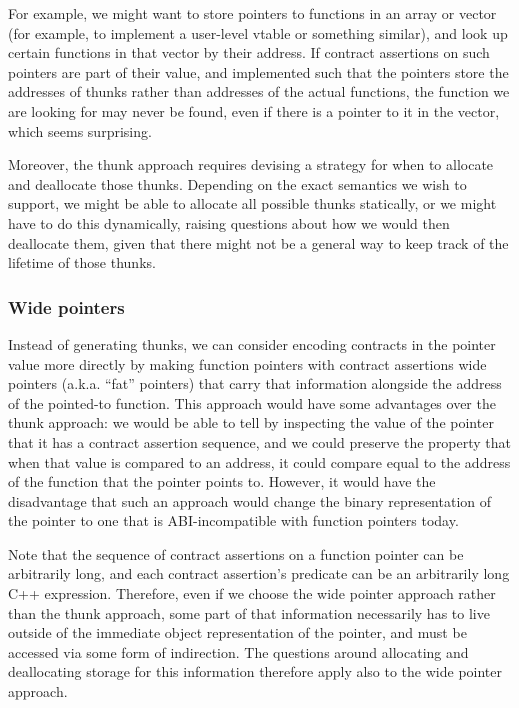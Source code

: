 For example, we might want to store pointers to functions in an array or vector (for example, to implement a user-level vtable or something similar), and look up certain functions in that vector by their address. If contract assertions on such pointers are part of their value, and implemented such that the pointers store the addresses of thunks rather than addresses of the actual functions, the function we are looking for may never be found, even if there is a pointer to it in the vector, which seems surprising.

Moreover, the thunk approach requires devising a strategy for when to allocate and deallocate those thunks. Depending on the exact semantics we wish to support, we might be able to allocate all possible thunks statically, or we might have to do this dynamically, raising questions about how we would then deallocate them, given that there might not be a general way to keep track of the lifetime of those thunks.


\subsubsection{Wide pointers}

Instead of generating thunks, we can consider encoding contracts in the pointer value more directly by making function pointers with contract assertions wide pointers (a.k.a. ``fat'' pointers) that carry that information alongside the address of the pointed-to function. This approach would have some advantages over the thunk approach: we would be able to tell by inspecting the value of the pointer that it has a contract assertion sequence, and we could preserve the property that when that value is compared to an address, it could compare equal to the address of the function that the pointer points to. However, it would have the disadvantage that such an approach would change the binary representation of the pointer to one that is ABI-incompatible with function pointers today.

Note that the sequence of contract assertions on a function pointer can be arbitrarily long, and each contract assertion's predicate can be an arbitrarily long C++ expression. Therefore, even if we choose the wide pointer approach rather than the thunk approach, some part of that information necessarily has to live outside of the immediate object representation of the pointer, and must be accessed via some form of indirection. The questions around allocating and deallocating storage for this information therefore apply also to the wide pointer approach.

